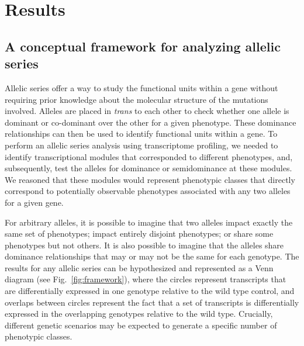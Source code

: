 \documentclass[10pt, twocolumn]{article}
\begin{document}
\section*{Results}
\subsection*{A conceptual framework for analyzing allelic series}
Allelic series offer a way to study the functional units within a gene without
requiring prior knowledge about the molecular structure of the mutations
involved. Alleles are placed in \emph{trans} to each other to check whether one
allele is dominant or co-dominant over the other for a given phenotype. These
dominance relationships can then be used to identify functional units within a
gene. To perform an allelic series analysis using transcriptome profiling, we
needed to identify transcriptional modules that corresponded to different
phenotypes, and, subsequently, test the alleles for dominance or semidominance
at these modules. We reasoned that these modules would represent phenotypic
classes that directly correspond to potentially observable phenotypes associated
with any two alleles for a given gene.

For arbitrary alleles, it is possible to imagine that two alleles impact exactly
the same set of phenotypes; impact entirely disjoint phenotypes; or share
some phenotypes but not others. It is also possible to imagine that the alleles
share dominance relationships that may or may not be the same for each genotype.
The results for any allelic series can be hypothesized and represented as a
Venn diagram (see Fig.~\ref{fig:framework}), where the circles represent
transcripts that are differentially expressed in one genotype relative to the
wild type control, and overlaps between circles represent the fact that a set of
transcripts is differentially expressed in the overlapping genotypes relative to
the wild type. Crucially, different genetic scenarios may be expected to
generate a specific number of phenotypic classes.
\end{document}

